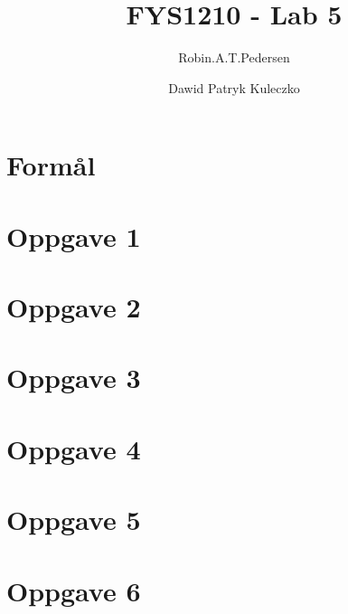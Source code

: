 \documentclass{article}
\begin{document}
\title{FYS1210 - Lab 5}
\author{Robin.A.T.Pedersen \and Dawid Patryk Kuleczko}
\maketitle

\section{Formål}


\section{Oppgave 1}


\section{Oppgave 2}


\section{Oppgave 3}


\section{Oppgave 4}


\section{Oppgave 5}


\section{Oppgave 6}

\end{document}
